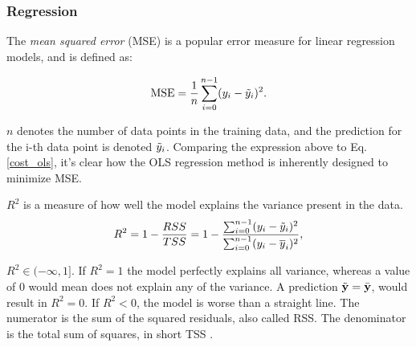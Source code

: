 \subsubsection{Regression}
The \emph{mean squared error} (MSE) is a popular error measure for linear regression models, and is defined as: 

\begin{equation}\label{mse}
    \text{MSE} = \frac{1}{n}\sum_{i=0}^{n-1}(y_i-\Tilde{y}_i)^2.
\end{equation}

$n$ denotes the number of data points in the training data, and the prediction for the i-th data point is denoted $\Tilde{y}_i$. Comparing the expression above to Eq. \ref{cost_ols}, it's clear how the OLS regression method is inherently designed to minimize MSE. 

$R^2$ is a measure of how well the model explains the variance present in the data. 
\begin{equation}
    R^2 = 1 - \frac{RSS}{TSS}= 1 - \frac{\sum_{i=0}^{n-1}(y_i-\Tilde{y}_i)^2}{\sum_{i=0}^{n-1}(y_i-\overline{y}_i)^2},
\end{equation}

$R^2 \in (-\infty,1]$. If $R^2 = 1$ the model perfectly explains all variance, whereas a value of 0 would mean does not explain any of the variance. 
A prediction $\tilde {\mathbf{y}} = \bar {\mathbf{y}}$, would result in $R^2 = 0$.
If $R^2<0$, the model is worse than a straight line.
The numerator is the sum of the squared residuals, also called RSS. The denominator is the total sum of squares, in short TSS \cite[p. 29]{martin}.

